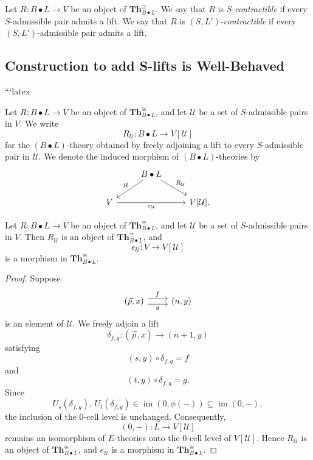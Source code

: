 \documentclass{tac}
\begin{document}
\begin{definition}\label{gen_contract_yay}
Let $R:B\bullet L\to V$ be an object of $\mathbf{Th}_{B\bullet L}^{\cong}$. We say that $R$ is \emph{$S$-contractible} if every $S$-admissible pair admits a lift. We say that $R$ is \emph{$(S,L')$-contractible} if every $(S,L')$-admissible pair admits a lift.
\end{definition}

\subsection*{Construction to add S-lifts is Well-Behaved}
```latex
\begin{definition}
Let $R:B\bullet L\to V$ be an object of $\mathbf{Th}_{B\bullet L}^{\cong}$, and let $\mathcal{U}$ be a set of $S$-admissible pairs in $V$. We write
\[
R_{\mathcal{U}}:B\bullet L\to V[\mathcal{U}]
\]
for the $(B\bullet L)$-theory obtained by freely adjoining a lift to every $S$-admissible pair in $\mathcal{U}$. We denote the induced morphism of $(B\bullet L)$-theories by
\[
\begin{tikzcd}
&B\bullet L\ar[ld,swap,"R"]\ar[dr,"R_\mathcal{U}"]&\\
V\ar[rr,swap,"e_\mathcal{U}"]&&V[\mathcal{U}].
\end{tikzcd}
\]
\end{definition}

\begin{theorem}\label{freely_add_lifts}
Let $R:B\bullet L\to V$ be an object of $\mathbf{Th}_{B\bullet L}^{\cong}$, and let $\mathcal{U}$ be a set of $S$-admissible pairs in $V$. Then $R_\mathcal{U}$ is an object of $\mathbf{Th}_{B\bullet L}^{\cong}$, and
\[
e_\mathcal{U}:V\to V[\mathcal{U}]
\]
is a morphism in $\mathbf{Th}_{B\bullet L}^{\cong}$.
\end{theorem}

\begin{proof}
Suppose
\[
\begin{tikzcd}
(\vec{p},x)\ar[r,shift left=.75ex,"f"]
\ar[r,shift right=.75ex,swap,"g"]&
(n,y)
\end{tikzcd}
\]
is an element of $\mathcal{U}$. We freely adjoin a lift
\[
\delta_{f,g}:(\vec{p},x)\to(n+1,y)
\]
satisfying
\[
(s,y)\circ\delta_{f,g}=f
\]
and
\[
(t,y)\circ\delta_{f,g}=g.
\]
Since
\[
U_s(\delta_{f,g}),\,U_t(\delta_{f,g})
\in\operatorname{im}(0,\phi(-))
\subseteq\operatorname{im}(0,-),
\]
the inclusion of the $0$-cell level is unchanged. Consequently,
\[
(0,-):L\longrightarrow V[\mathcal{U}]
\]
remains an isomorphism of $E$-theories onto the $0$-cell level of $V[\mathcal{U}]$. Hence $R_\mathcal{U}$ is an object of $\mathbf{Th}_{B\bullet L}^{\cong}$, and $e_\mathcal{U}$ is a morphism in $\mathbf{Th}_{B\bullet L}^{\cong}$.
\end{proof}
\end{document}
